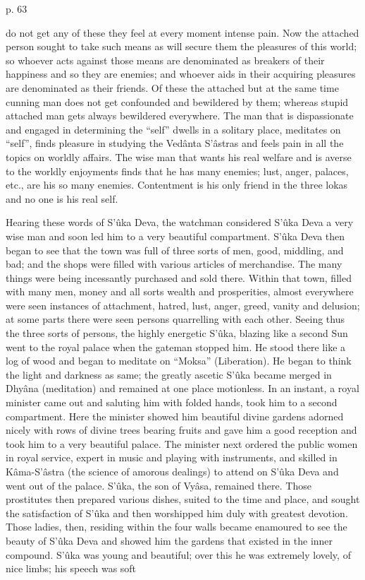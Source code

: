  

p. 63

 

do not get any of these they feel at every moment intense pain. Now the attached person sought to take such means as will secure them the pleasures of this world; so whoever acts against those means are denominated as breakers of their happiness and so they are enemies; and whoever aids in their acquiring pleasures are denominated as their friends. Of these the attached but at the same time cunning man does not get confounded and bewildered by them; whereas stupid attached man gets always bewildered everywhere. The man that is dispassionate and engaged in determining the “self” dwells in a solitary place, meditates on “self”, finds pleasure in studying the Vedânta  S’âstras and feels pain in all the topics on worldly affairs. The wise man that wants his real welfare and is averse to the worldly enjoyments finds that he has many enemies; lust, anger, palaces, etc., are his so many enemies. Contentment is his only friend in the three lokas and no one is his real self.

 

Hearing these words of S’ûka Deva, the watchman considered S’ûka Deva a very wise man and soon led him to a very beautiful compartment. S’ûka Deva then began to see that the town was full of three sorts of men, good, middling, and bad; and the shops were filled with various articles of merchandise. The many things were being incessantly purchased and sold there. Within that town, filled with many men, money and all sorts wealth and prosperities, almost everywhere were seen instances of attachment, hatred, lust, anger, greed, vanity and delusion; at some parts there were seen persons quarrelling with each other. Seeing thus the three sorts of persons, the highly energetic S’ûka, blazing like a second Sun went to the royal palace when the gateman stopped him. He stood there like a log of wood and began to meditate on “Moksa” (Liberation). He began to think the light and darkness as same; the greatly ascetic S’ûka became merged in Dhyâna (meditation) and remained at one place motionless. In an instant, a royal minister came out and saluting him with folded hands, took him to a second compartment. Here the minister showed him beautiful divine gardens adorned nicely with rows of divine trees bearing fruits and gave him a good reception and took him to a very beautiful palace. The minister next ordered the public women in royal service, expert in music and playing with instruments, and skilled in Kâma-S’âstra (the science of amorous dealings) to attend on S’ûka Deva and went out of the palace. S’ûka, the son of Vyâsa, remained there. Those prostitutes then prepared various dishes, suited to the time and place, and sought the satisfaction of S’ûka and then worshipped him duly with greatest devotion. Those ladies, then, residing within the four walls became enamoured to see the beauty of S’ûka Deva and showed him the gardens that existed in the inner compound. S’ûka was young and beautiful; over this he was extremely lovely, of nice limbs; his speech was soft

